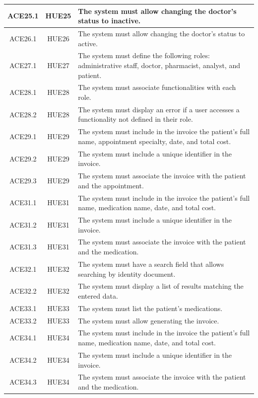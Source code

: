 \documentclass{prgrado}
\begin{document}
\begin{longtable}{|c|c|p{9cm}|}
ACE25.1 & HUE25 & The system must allow changing the doctor's status to inactive. \\ \hline
ACE26.1 & HUE26 & The system must allow changing the doctor's status to active. \\ \hline

ACE27.1 & HUE27 & The system must define the following roles: administrative staff, doctor, pharmacist, analyst, and patient. \\ \hline

ACE28.1 & HUE28 & The system must associate functionalities with each role. \\ \hline
ACE28.2 & HUE28 & The system must display an error if a user accesses a functionality not defined in their role. \\ \hline

ACE29.1 & HUE29 & The system must include in the invoice the patient's full name, appointment specialty, date, and total cost. \\ \hline
ACE29.2 & HUE29 & The system must include a unique identifier in the invoice. \\ \hline
ACE29.3 & HUE29 & The system must associate the invoice with the patient and the appointment. \\ \hline

ACE31.1 & HUE31 & The system must include in the invoice the patient's full name, medication name, date, and total cost. \\ \hline
ACE31.2 & HUE31 & The system must include a unique identifier in the invoice. \\ \hline
ACE31.3 & HUE31 & The system must associate the invoice with the patient and the medication. \\ \hline

ACE32.1 & HUE32 & The system must have a search field that allows searching by identity document. \\ \hline
ACE32.2 & HUE32 & The system must display a list of results matching the entered data. \\ \hline

ACE33.1 & HUE33 & The system must list the patient's medications. \\ \hline
ACE33.2 & HUE33 & The system must allow generating the invoice. \\ \hline

ACE34.1 & HUE34 & The system must include in the invoice the patient's full name, medication name, date, and total cost. \\ \hline
ACE34.2 & HUE34 & The system must include a unique identifier in the invoice. \\ \hline
ACE34.3 & HUE34 & The system must associate the invoice with the patient and the medication. \\ \hline


\end{longtable}
\end{document}
